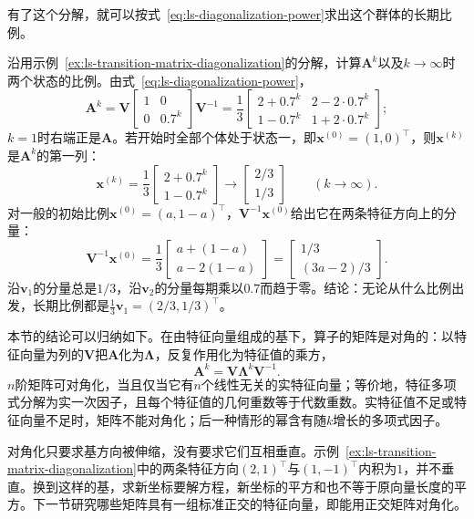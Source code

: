 有了这个分解，就可以按式~\eqref{eq:ls-diagonalization-power}求出这个群体的长期比例。
\begin{example}[转移矩阵的长期比例]
\label{ex:ls-transition-matrix-long-run}
沿用示例~\ref{ex:ls-transition-matrix-diagonalization}的分解，计算$\bm A^k$以及$k\to\infty$时两个状态的比例。由式~\eqref{eq:ls-diagonalization-power}，
\[
 \bm A^k=\bm V\begin{bmatrix}1&0\\0&0.7^k\end{bmatrix}\bm V^{-1}
 =\frac13\begin{bmatrix}2+0.7^k&2-2\cdot0.7^k\\1-0.7^k&1+2\cdot0.7^k\end{bmatrix};
\]
$k=1$时右端正是$\bm A$。若开始时全部个体处于状态一，即$\bm x^{(0)}=(1,0)^{\top}$，则$\bm x^{(k)}$是$\bm A^k$的第一列：
\[
 \bm x^{(k)}=\frac13\begin{bmatrix}2+0.7^k\\1-0.7^k\end{bmatrix}
 \to\begin{bmatrix}2/3\\1/3\end{bmatrix}\qquad(k\to\infty).
\]
对一般的初始比例$\bm x^{(0)}=(a,1-a)^{\top}$，$\bm V^{-1}\bm x^{(0)}$给出它在两条特征方向上的分量：
\[
 \bm V^{-1}\bm x^{(0)}=\frac13\begin{bmatrix}a+(1-a)\\a-2(1-a)\end{bmatrix}=\begin{bmatrix}1/3\\(3a-2)/3\end{bmatrix}.
\]
沿$\bm v_1$的分量总是$1/3$，沿$\bm v_2$的分量每期乘以$0.7$而趋于零。结论：无论从什么比例出发，长期比例都是$\tfrac13\bm v_1=(2/3,1/3)^{\top}$。
\end{example}

本节的结论可以归纳如下。在由特征向量组成的基下，算子的矩阵是对角的：以特征向量为列的$\bm V$把$\bm A$化为$\bm\Lambda$，反复作用化为特征值的乘方，
\[
 \bm A^k=\bm V\bm\Lambda^k\bm V^{-1}.
\]
$n$阶矩阵可对角化，当且仅当它有$n$个线性无关的实特征向量；等价地，特征多项式分解为实一次因子，且每个特征值的几何重数等于代数重数。实特征值不足或特征向量不足时，矩阵不能对角化；后一种情形的幂含有随$k$增长的多项式因子。

对角化只要求基方向被伸缩，没有要求它们互相垂直。示例~\ref{ex:ls-transition-matrix-diagonalization}中的两条特征方向$(2,1)^{\top}$与$(1,-1)^{\top}$内积为$1$，并不垂直。换到这样的基，求新坐标要解方程，新坐标的平方和也不等于原向量长度的平方。下一节研究哪些矩阵具有一组标准正交的特征向量，即能用正交矩阵对角化。

